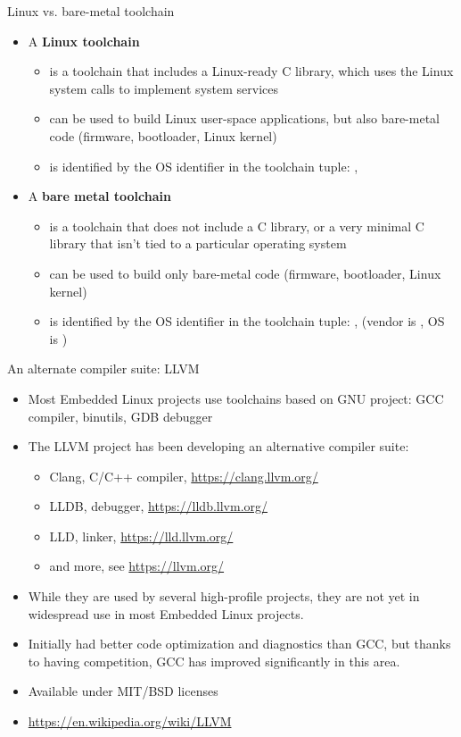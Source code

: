 \begin{frame}{Linux vs. bare-metal toolchain}
  \begin{itemize}
  \item A {\bf Linux toolchain}
    \begin{itemize}
    \item is a toolchain that includes a Linux-ready C library, which
      uses the Linux system calls to implement system services
    \item can be used to build Linux user-space applications, but also
      bare-metal code (firmware, bootloader, Linux kernel)
    \item is identified by the  OS identifier in the
      toolchain tuple: ,
    \end{itemize}
  \item A {\bf bare metal toolchain}
    \begin{itemize}
    \item is a toolchain that does not include a C library, or a very
      minimal C library that isn't tied to a particular operating
      system
    \item can be used to build only bare-metal code (firmware,
      bootloader, Linux kernel)
    \item is identified by the  OS identifier in the
      toolchain tuple: , 
      (vendor is , OS is )
    \end{itemize}
  \end{itemize}
\end{frame}

\begin{frame}{An alternate compiler suite: LLVM}
  \begin{itemize}
  \item Most Embedded Linux projects use toolchains based on GNU
    project: GCC compiler, binutils, GDB debugger
  \item The LLVM project has been developing an alternative compiler
    suite:
    \begin{itemize}
    \item Clang, C/C++ compiler, \url{https://clang.llvm.org/}
    \item LLDB, debugger, \url{https://lldb.llvm.org/}
    \item LLD, linker, \url{https://lld.llvm.org/}
    \item and more, see \url{https://llvm.org/}
    \end{itemize}
  \item While they are used by several high-profile projects, they are
    not yet in widespread use in most Embedded Linux projects.
  \item Initially had better code optimization and diagnostics than
    GCC, but thanks to having competition, GCC has improved
    significantly in this area.
  \item Available under MIT/BSD licenses
  \item \url{https://en.wikipedia.org/wiki/LLVM}
  \end{itemize}
\end{frame}
